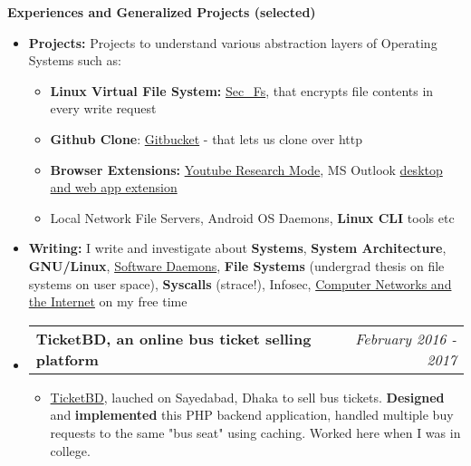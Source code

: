 \documentclass[legalpaper,10pt]{article}
\makeatletter
\newcommand{\resheading}[1]{{\large \colorbox{mygrey}{\begin{minipage}{\textwidth}{\textbf{#1 \vphantom{p\^{E}}}}\end{minipage}}}}
\newcommand{\ressubheading}[4]{
	\begin{tabular*}{7.1in}{l@{\extracolsep{\fill}}r}
		\textbf{#1} & \textit{#4} \\
	\end{tabular*}\vspace{-6pt}}
\makeatother
\begin{document}
	\vspace{0.20in}
	
	\resheading{Experiences and Generalized Projects (selected)}
	\begin{itemize}  
    	 \item \textbf{Projects:} Projects to understand various abstraction layers of Operating Systems such as:
    	    \begin{itemize}
    	        \item \textbf{Linux Virtual File System:}         \href{https://github.com/ovebepari/sec\_fs}{Sec\_Fs}, that encrypts file contents in every write request
    	        \item \textbf{Github Clone}: \href{https://github.com/ovebepari/Github_Clone}{Gitbucket} - that lets us clone over http
    	        \item \textbf{Browser Extensions:} \href{https://github.com/ovebepari/Youtube-Research-Mode}{Youtube Research Mode}, MS Outlook \href{https://github.com/ovebepari/PhishMe}{desktop and web app extension}
    	        \item Local Network File Servers, Android OS Daemons, \textbf{Linux CLI} tools etc
    	    \end{itemize}
		
    	\vspace{0.03in}

		\item \textbf{Writing:} I write and investigate about \textbf{Systems}, \textbf{System Architecture}, \textbf{GNU/Linux}, \href{https://ovebepari.github.io/linux\%7Csystems/docker-socket-tale/}{Software Daemons}, \textbf{File Systems} (undergrad thesis on file systems on user space), \textbf{Syscalls} (strace!), Infosec, \href{https://ovebepari.github.io/Computer-Networking-Series/}{Computer Networks and the Internet} on my free time
		
		\vspace{0.03in}
		\item \ressubheading{TicketBD, an online bus ticket selling platform}{}{}{February 2016 - 2017}
		\begin{itemize} 
			\item \href{https://www.facebook.com/ticketbd.online}{TicketBD}, lauched on Sayedabad, Dhaka to sell bus tickets. \textbf{Designed} and \textbf{implemented} this PHP backend application, handled multiple buy requests to the same "bus seat" using caching. Worked here when I was in college.
		\end{itemize}

	\end{itemize}
\end{document}
